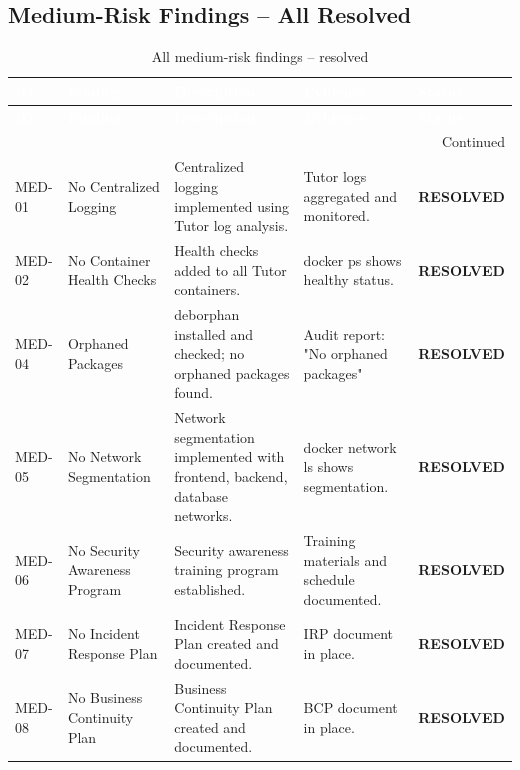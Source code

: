 \subsection{Medium-Risk Findings – All Resolved}
\begin{center}
\begin{longtable}{|p{}|p{}|p{}|p{}|p{}|}
\caption[Medium-Risk Findings]{All medium-risk findings – resolved}
\label{tab:medium-findings} \\
\hline
\rowcolor{mooveblue}
\textcolor{white}{\textbf{ID}} & \textcolor{white}{\textbf{Finding}} & \textcolor{white}{\textbf{Description}} & \textcolor{white}{\textbf{Evidence}} & \textcolor{white}{\textbf{Status}} \\
\hline
\endfirsthead
\hline
\rowcolor{mooveblue}
\textcolor{white}{\textbf{ID}} & \textcolor{white}{\textbf{Finding}} & \textcolor{white}{\textbf{Description}} & \textcolor{white}{\textbf{Evidence}} & \textcolor{white}{\textbf{Status}} \\
\hline
\endhead
\hline
\multicolumn{5}{|r|}{Continued} \\
\hline
\endfoot
\hline
\endlastfoot
MED-01 & No Centralized Logging & Centralized logging implemented using Tutor log analysis. & Tutor logs aggregated and monitored. & \textbf{RESOLVED} \\
MED-02 & No Container Health Checks & Health checks added to all Tutor containers. & docker ps shows healthy status. & \textbf{RESOLVED} \\
MED-04 & Orphaned Packages & deborphan installed and checked; no orphaned packages found. & Audit report: "No orphaned packages" & \textbf{RESOLVED} \\
MED-05 & No Network Segmentation & Network segmentation implemented with frontend, backend, database networks. & docker network ls shows segmentation. & \textbf{RESOLVED} \\
MED-06 & No Security Awareness Program & Security awareness training program established. & Training materials and schedule documented. & \textbf{RESOLVED} \\
MED-07 & No Incident Response Plan & Incident Response Plan created and documented. & IRP document in place. & \textbf{RESOLVED} \\
MED-08 & No Business Continuity Plan & Business Continuity Plan created and documented. & BCP document in place. & \textbf{RESOLVED} \\
\hline
\end{longtable}
\end{center}

